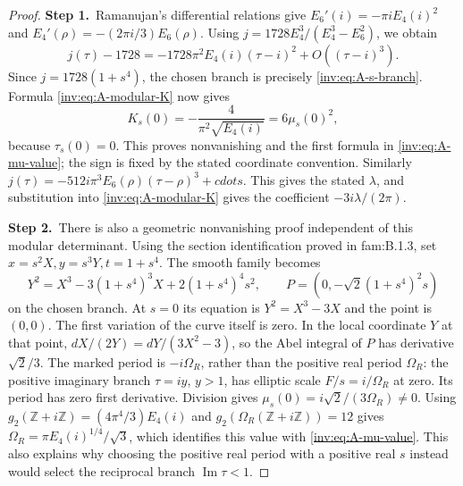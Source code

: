 \documentclass[11pt,a4paper]{article}
\theoremstyle{plain}
\theoremstyle{definition}
\begin{document}
\begin{proof}
\par\smallskip\noindent\textbf{Step 1.}\ Ramanujan's differential relations give
$E_6'(i)=-\pi i E_4(i)^2$ and
$E_4'(\rho)=-(2\pi i/3)E_6(\rho)$.
Using $j=1728E_4^3/(E_4^3-E_6^2)$, we obtain
\[
j(\tau)-1728=-1728\pi^2E_4(i)(\tau-i)^2+O((\tau-i)^3).
\]
Since $j=1728(1+s^4)$, the chosen branch is precisely
\eqref{inv:eq:A-s-branch}.  Formula \eqref{inv:eq:A-modular-K} now gives
\[
K_s(0)=-\frac4{\pi^2\sqrt{E_4(i)}}=6\mu_s(0)^2,
\]
because $\tau_s(0)=0$.  This proves nonvanishing and the first
formula in \eqref{inv:eq:A-mu-value}; the sign is fixed by the stated
coordinate convention.  Similarly
$j(\tau)=-512i\pi^3E_6(\rho)(\tau-\rho)^3+cdots$.
This gives the stated $\lambda$, and substitution into
\eqref{inv:eq:A-modular-K} gives the coefficient $-3i\lambda/(2\pi)$.

\par\smallskip\noindent\textbf{Step 2.}\ There is also a geometric nonvanishing proof independent of this
modular determinant.  Using the section identification proved in
fam:B.1.3, set $x=s^2X,y=s^3Y,t=1+s^4$.  The smooth family becomes
\[
Y^2=X^3-3(1+s^4)^3X+2(1+s^4)^4s^2,
\qquad P=(0,-\sqrt2(1+s^4)^2s)
\]
on the chosen branch.  At $s=0$ its equation is
$Y^2=X^3-3X$ and the point is $(0,0)$.  The first variation of the
curve itself is zero.  In the local coordinate $Y$ at that point,
$dX/(2Y)=dY/(3X^2-3)$, so the Abel integral of $P$ has derivative
$\sqrt2/3$.  The marked period is $-i\Omega_R$, rather than the
positive real period $\Omega_R$: the positive imaginary branch
$\tau=iy$, $y>1$, has elliptic scale $F/s=i/\Omega_R$ at zero.
Its period has zero first derivative.  Division gives
$\mu_s(0)=i\sqrt2/(3\Omega_R)\ne0$.
Using $g_2(\mathbb Z+i\mathbb Z)=(4\pi^4/3)E_4(i)$ and
$g_2(\Omega_R(\mathbb Z+i\mathbb Z))=12$ gives
$\Omega_R=\pi E_4(i)^{1/4}/\sqrt3$, which identifies this value
with \eqref{inv:eq:A-mu-value}.  This also explains why choosing the
positive real period with a positive real $s$ instead would select
the reciprocal branch $\operatorname{Im}\tau<1$.


\end{proof}
\end{document}
